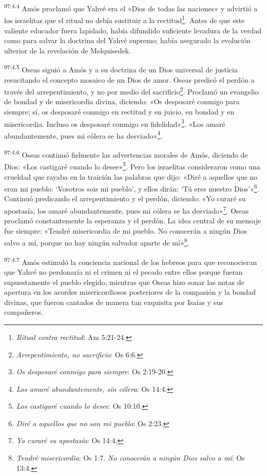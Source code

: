 \par
\textsuperscript{97:4.4} Amós proclamó que Yahvé era el «Dios de todas las naciones» y advirtió a los israelitas que el ritual no debía sustituir a la rectitud\footnote{\textit{Ritual contra rectitud}: Am 5:21-24.}. Antes de que este valiente educador fuera lapidado, había difundido suficiente levadura de la verdad como para salvar la doctrina del Yahvé supremo; había asegurado la evolución ulterior de la revelación de Melquisedek.

\par
\textsuperscript{97:4.5} Oseas siguió a Amós y a su doctrina de un Dios universal de justicia resucitando el concepto mosaico de un Dios de amor. Oseas predicó el perdón a través del arrepentimiento, y no por medio del sacrificio\footnote{\textit{Arrepentimiento, no sacrificio}: Os 6:6.}. Proclamó un evangelio de bondad y de misericordia divina, diciendo: «Os desposaré conmigo para siempre; sí, os desposaré conmigo en rectitud y en juicio, en bondad y en misericordia. Incluso os desposaré conmigo en fidelidad»\footnote{\textit{Os desposaré conmigo para siempre}: Os 2:19-20.}. «Los amaré abundantemente, pues mi cólera se ha desviado»\footnote{\textit{Los amaré abundantemente, sin cólera}: Os 14:4.}.

\par
\textsuperscript{97:4.6} Oseas continuó fielmente las advertencias morales de Amós, diciendo de Dios: «Los castigaré cuando lo desee»\footnote{\textit{Los castigaré cuando lo desee}: Os 10:10.}. Pero los israelitas consideraron como una crueldad que rayaba en la traición las palabras que dijo: «Diré a aquellos que no eran mi pueblo: `Vosotros sois mi pueblo', y ellos dirán: `Tú eres nuestro Dios'»\footnote{\textit{Diré a aquellos que no son mi pueblo}: Os 2:23.}. Continuó predicando el arrepentimiento y el perdón, diciendo: «Yo curaré su apostasía; los amaré abundantemente, pues mi cólera se ha desviado»\footnote{\textit{Yo curaré su apostasía}: Os 14:4.}. Oseas proclamó constantemente la esperanza y el perdón. La idea central de su mensaje fue siempre: «Tendré misericordia de mi pueblo. No conocerán a ningún Dios salvo a mí, porque no hay ningún salvador aparte de mí»\footnote{\textit{Tendré misericordia}: Os 1:7. \textit{No conocerán a ningún Dios salvo a mí}: Os 13:4.}.

\par
\textsuperscript{97:4.7} Amós estimuló la conciencia nacional de los hebreos para que reconocieran que Yahvé no perdonaría ni el crimen ni el pecado entre ellos porque fueran supuestamente el pueblo elegido, mientras que Oseas hizo sonar las notas de apertura en los acordes misericordiosos posteriores de la compasión y la bondad divinas, que fueron cantados de manera tan exquisita por Isaías y sus compañeros.

